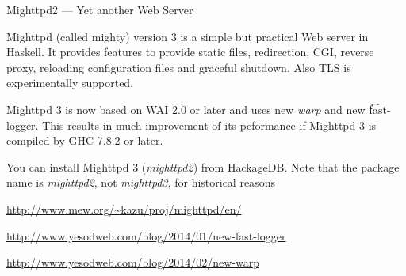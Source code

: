 \begin{hcarentry}[updated]{Mighttpd2 --- Yet another Web Server}
\label{mighttpd2}
\makeheader

Mighttpd (called mighty) version 3 is a simple but practical Web server in Haskell.
It provides features to provide static files, redirection, CGI, reverse proxy, reloading configuration files and graceful shutdown. Also TLS is experimentally supported.

Mighttpd 3 is now based on WAI 2.0 or later and uses new {\it warp} and new {\t fast-logger}. This results in much improvement of its peformance if Mighttpd 3 is compiled by GHC 7.8.2 or later.

You can install Mighttpd 3 ({\it mighttpd2}) from HackageDB. Note that the package name is {\it mighttpd2}, not {\it mighttpd3}, for historical reasons

\FurtherReading
\begin{compactitem}
\item \url{http://www.mew.org/~kazu/proj/mighttpd/en/}
\item \url{http://www.yesodweb.com/blog/2014/01/new-fast-logger}
\item \url{http://www.yesodweb.com/blog/2014/02/new-warp}
\end{compactitem}
\end{hcarentry}
